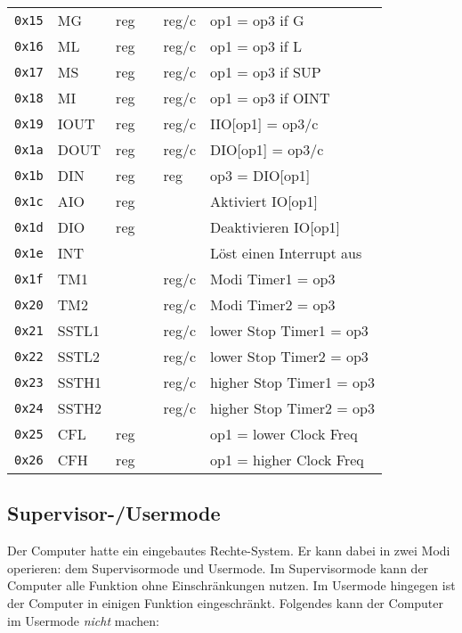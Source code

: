 \documentclass{scrartcl}
\begin{document}
\begin{center}
\begin{table*}
\begin{tabular}{l | l l l l | l}
			\texttt{0x15} & MG   & reg &  & reg/c & op1 = op3 if G \\
			\texttt{0x16} & ML   & reg &  & reg/c & op1 = op3 if L \\
			\texttt{0x17} & MS & reg &  & reg/c & op1 = op3 if SUP \\
			\texttt{0x18} & MI & reg &  & reg/c & op1 = op3 if OINT \\
			\hline
			\texttt{0x19} & IOUT & reg &  & reg/c & IIO[op1] = op3/c \\
			\texttt{0x1a} & DOUT & reg &  & reg/c & DIO[op1] = op3/c \\
			\texttt{0x1b} & DIN  & reg &  & reg & op3 = DIO[op1] \\
			\texttt{0x1c} & AIO  & reg &  &  & Aktiviert IO[op1] \\
			\texttt{0x1d} & DIO  & reg &  &  & Deaktivieren IO[op1] \\
			\hline
			\texttt{0x1e} & INT  & & & & Löst einen Interrupt aus \\
			\texttt{0x1f} & TM1  & & & reg/c & Modi Timer1 = op3 \\
			\texttt{0x20} & TM2  & & & reg/c & Modi Timer2 = op3 \\
			\texttt{0x21} & SSTL1 & & & reg/c & lower Stop Timer1 = op3 \\
			\texttt{0x22} & SSTL2 & & & reg/c & lower Stop Timer2 = op3 \\
			\texttt{0x23} & SSTH1 & & & reg/c & higher Stop Timer1 = op3 \\			
			\texttt{0x24} & SSTH2 & & & reg/c & higher Stop Timer2 = op3 \\
			\texttt{0x25} & CFL  & reg & & & op1 = lower Clock Freq \\
			\texttt{0x26} & CFH  & reg & & & op1 = higher Clock Freq \\
			
			\hline
		\end{tabular}
	\end{table*}
\end{center}


\subsection{\label{section:supervisor}Supervisor-/Usermode}

Der Computer hatte ein eingebautes Rechte-System.
Er kann dabei in zwei Modi operieren: dem Supervisormode und Usermode.
Im Supervisormode kann der Computer alle Funktion ohne Einschränkungen nutzen.
Im Usermode hingegen ist der Computer in einigen Funktion eingeschränkt.
Folgendes kann der Computer im Usermode \emph{nicht} machen:
\end{document}
